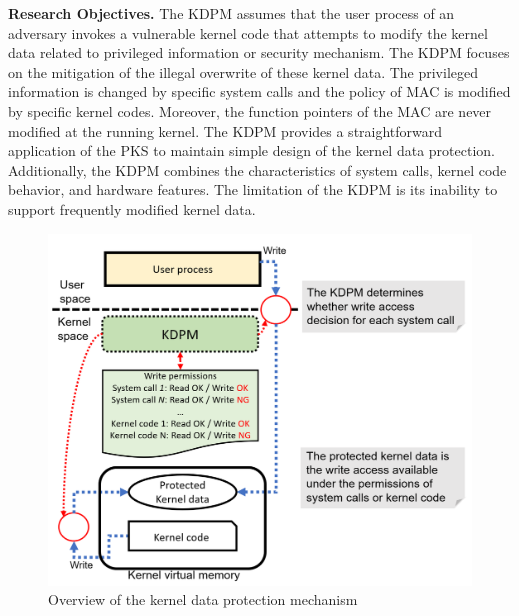 %
{\bf Research Objectives.}
The KDPM assumes that the user process of an adversary invokes a vulnerable
kernel code that attempts to modify the kernel data related to privileged
information or security mechanism.
%
The KDPM focuses on the mitigation of the illegal overwrite of these kernel
data.
%
The privileged information is changed by specific system calls and the policy of
MAC is modified by specific kernel codes. Moreover, the function pointers of the MAC
are never modified at the running kernel.
%
The KDPM provides a straightforward application of the PKS to maintain simple
design of the kernel data protection. Additionally, the KDPM combines the
characteristics of system calls, kernel code behavior, and hardware features. 
%
The limitation of the KDPM is its inability to support frequently modified kernel data. 


\begin{figure}[tb]
  \centering        
  \includegraphics[bb=0 0 972 809, scale=.240]{./imgs/001_screenshot_2021-07-26_17.18.08.png}
  \caption{
    Overview of the kernel data protection mechanism
  }
  \label{fig:approach_overview}
\end{figure}


